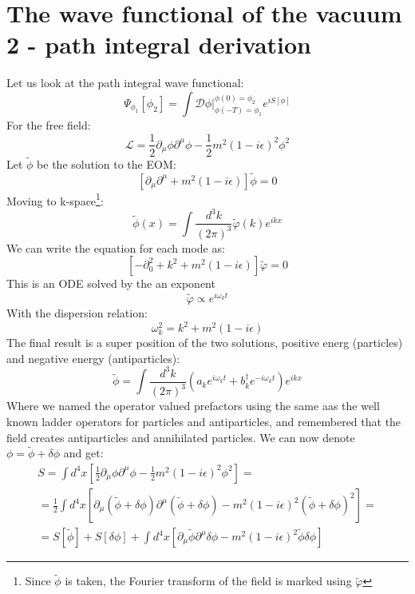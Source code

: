 \documentclass{article}
\begin{document}
\section{The wave functional of the vacuum 2 - path integral derivation}
Let us look at the path integral wave functional:
\begin{equation}
    \Psi_{\phi_1}[\phi_2] = \int \mathcal{D} \phi \Big|_{\phi(-T) = \phi_1}^{\phi(0) = \phi_2}e^{iS[\phi]}
\end{equation}
For the free field:
\begin{equation}
    \mathcal{L} = \frac{1}{2}\partial_\mu\phi\partial^\mu\phi - \frac{1}{2}m^2(1 - i\epsilon)^2\phi^2
\end{equation}
Let $\tilde{\phi}$ be the solution to the EOM:
\begin{equation}
    \left[\partial_\mu\partial^\mu + m^2(1 - i\epsilon)\right]\tilde{\phi} = 0
\end{equation}
Moving to k-space\footnote{Since $\tilde{\phi}$ is taken, the Fourier transform of the field is marked using $\tilde{\varphi}$}:
\begin{equation}
    \tilde{\phi}(x) = \int \frac{d^3k}{(2\pi)^3} \tilde{\varphi}(k) e^{ikx}
\end{equation}
We can write the equation for each mode as:
\begin{equation}
    \left[-\partial_0^2 + k^2 + m^2(1 - i\epsilon)\right]\tilde{\varphi} = 0
\end{equation}
This is an ODE solved by the an exponent
\begin{equation}
    \tilde{\varphi} \propto e^{i\omega_kt}
\end{equation}
With the dispersion relation:
\begin{equation}
    \omega_k^2 = k^2 + m^2(1 - i\epsilon)
\end{equation}
The final result is a super position of the two solutions, positive energ (particles) and negative energy (antiparticles):
\begin{equation}
    \tilde{\phi} = \int \frac{d^3k}{(2\pi)^3} \left(
        a_k e^{i\omega_k t} + b_k^\dagger e^{-i\omega_k t}
    \right) e^{ikx}
\end{equation}
Where we named the operator valued prefactors using the same aas the well known ladder operators for particles and antiparticles, and remembered that the field creates antiparticles and annihilated particles.
We can now denote $\phi = \tilde{\phi} + \delta\phi$ and get:
\begin{equation}
\begin{gathered}
    S = \int d^4x \left[
        \frac{1}{2}\partial_\mu\phi\partial^\mu\phi - \frac{1}{2}m^2(1 - i\epsilon)^2\phi^2
    \right] = \\ =
    \frac{1}{2}\int d^4x \left[
        \partial_\mu(\tilde{\phi} + \delta\phi)\partial^\mu(\tilde{\phi} + \delta\phi) - m^2(1 - i\epsilon)^2(\tilde{\phi} + \delta\phi)^2
    \right] = \\ =
    S[\tilde{\phi}] + S[\delta\phi] + \int d^4x \left[
        \partial_\mu\tilde{\phi}\partial^\mu\delta\phi - m^2(1 - i\epsilon)^2\tilde{\phi}\delta\phi
    \right]
\end{gathered}
\end{equation}
\end{document}
